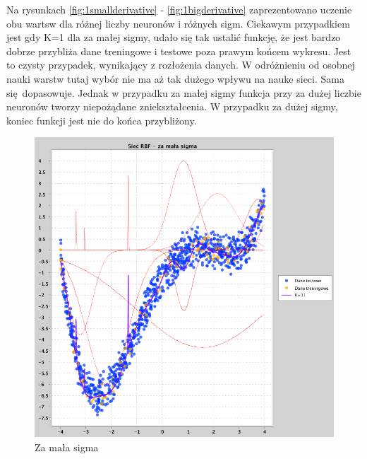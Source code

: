 \documentclass[a4paper, portrait,11pt]{article}
\begin{document}
Na rysunkach \ref{fig:1smallderivative} - \ref{fig:1bigderivative} zaprezentowano uczenie obu wartsw dla różnej liczby neuronów i różnych sigm.
Ciekawym przypadkiem jest gdy K=1 dla za małej sigmy, udało się tak ustalić funkcję, że jest bardzo dobrze przybliża dane treningowe i testowe poza prawym końcem wykresu.
Jest to czysty przypadek, wynikający z rozłożenia danych.
W odróżnieniu od osobnej nauki warstw tutaj wybór nie ma aż tak dużego wpływu na nauke sieci. Sama się dopasowuje.
Jednak w przypadku za małej sigmy funkcja przy za dużej liczbie neuronów tworzy niepożądane zniekształcenia.
W przypadku za dużej sigmy, koniec funkcji jest nie do końca przybliżony. 
\begin{figure}[!htb]
  \begin{minipage}{0.33\textwidth}
    \centering
    \includegraphics[width=1\linewidth]{../data/approximation3/2/derivatives/small.png}
    \caption{\label{fig:2smallderivative}Za mała sigma}
  \end{minipage}
  \begin{minipage}{0.33\textwidth}
    \centering

\end{minipage}
\end{figure}
\end{document}
